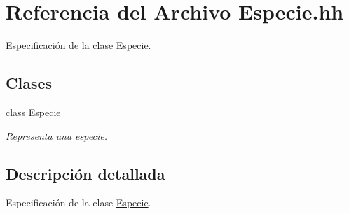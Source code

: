 \hypertarget{_especie_8hh}{}\section{Referencia del Archivo Especie.\+hh}
\label{_especie_8hh}


Especificación de la clase \hyperlink{class_especie}{Especie}.  


\subsection*{Clases}
\begin{DoxyCompactItemize}
\item 
class \hyperlink{class_especie}{Especie}
\begin{DoxyCompactList}\small\item\em Representa una especie. \end{DoxyCompactList}\end{DoxyCompactItemize}


\subsection{Descripción detallada}
Especificación de la clase \hyperlink{class_especie}{Especie}. 

